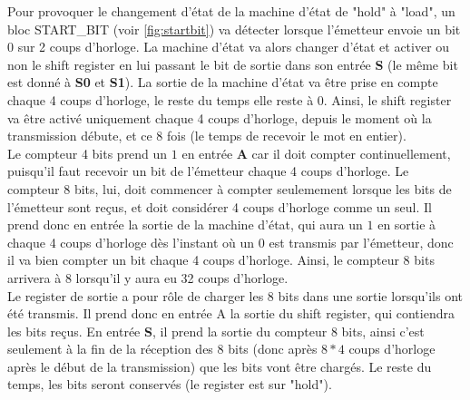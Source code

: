 \documentclass[a4paper]{article} %
\begin{document}
\begin{tcolorbox}[colframe=Monokaimagenta,colback=white]
Pour provoquer le changement d'état de la machine d'état de "hold" à "load", un bloc START\_BIT (voir \ref{fig:startbit}) va détecter lorsque l'émetteur envoie un bit $0$ sur 2 coups d'horloge. La machine d'état va alors changer d'état et activer ou non le shift register en lui passant le bit de sortie dans son entrée \textbf{S} (le même bit est donné à \textbf{S0} et \textbf{S1}). La sortie de la machine d'état va être prise en compte chaque 4 coups d'horloge, le reste du temps elle reste à 0. Ainsi, le shift register va être activé uniquement chaque 4 coups d'horloge, depuis le moment où la transmission débute, et ce 8 fois (le temps de recevoir le mot en entier).\\
Le compteur 4 bits prend un $1$ en entrée \textbf{A} car il doit compter continuellement, puisqu'il faut recevoir un bit de l'émetteur chaque 4 coups d'horloge. Le compteur 8 bits, lui, doit commencer à compter seulemement lorsque les bits de l'émetteur sont reçus, et doit considérer 4 coups d'horloge comme un seul. Il prend donc en entrée la sortie de la machine d'état, qui aura un $1$ en sortie à chaque 4 coups d'horloge dès l'instant où un 0 est transmis par l'émetteur, donc il va bien compter un bit chaque 4 coups d'horloge. Ainsi, le compteur 8 bits arrivera à 8 lorsqu'il y aura eu 32 coups d'horloge.\\
Le register de sortie a pour rôle de charger les 8 bits dans une sortie lorsqu'ils ont été transmis. Il prend donc en entrée A la sortie du shift register, qui contiendra les bits reçus. En entrée \textbf{S}, il prend la sortie du compteur 8 bits, ainsi c'est seulement à la fin de la réception des 8 bits (donc après $8*4$ coups d'horloge après le début de la transmission) que les bits vont être chargés. Le reste du temps, les bits seront conservés (le register est sur "hold").\\

\end{tcolorbox}
\end{document}
